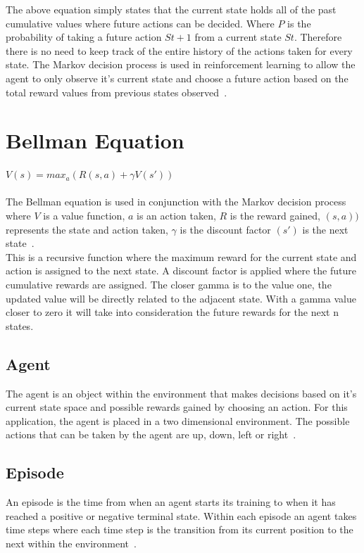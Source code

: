 The above equation simply states that the current state holds all of the past cumulative values where future actions can be decided.
Where $P$ is the probability of taking a future action $St+1$  from a current state $St$. Therefore there is no need to keep track of the entire history of the actions taken for every state. The Markov decision process is used in reinforcement learning to allow the agent to only observe it's current state and choose a future action based on the total reward values from previous states observed~\cite[p.~67]{sutton_barto_2018}.

\section{Bellman Equation}
$V(s) = max_{a}(R(s,a)+\gamma V(s'))$\\\\

The Bellman equation is used in conjunction with the Markov decision process where $V$ is a value function, $a$ is an action taken, $R$ is the reward gained, $(s,a))$ represents the state and action taken, $\gamma$ is the discount factor $(s')$ is the next state~\cite[p.~75]{sutton_barto_2018}.
\\

This is a recursive function where the maximum reward for the current state and action is assigned to the next state. A discount factor is applied where the future cumulative rewards are assigned. The closer gamma is to the value one, the updated value will be directly related to the adjacent state. With a gamma value closer to zero it will take into consideration the future rewards for the next n states.
\subsection{Agent}
The agent is an object within the environment that makes decisions based on it's current state space and possible rewards gained by choosing an action. For this application, the agent is placed in a two dimensional environment. The possible actions that can be taken by the agent are up, down, left or right~\cite{nwana_1996}.\\
\subsection{Episode}
An episode is the time from when an agent starts its training to when it has reached a positive or negative terminal state. Within each episode an agent takes time steps where each time step is the transition from its current position to the next within the environment~\cite{Watkins1992}.
